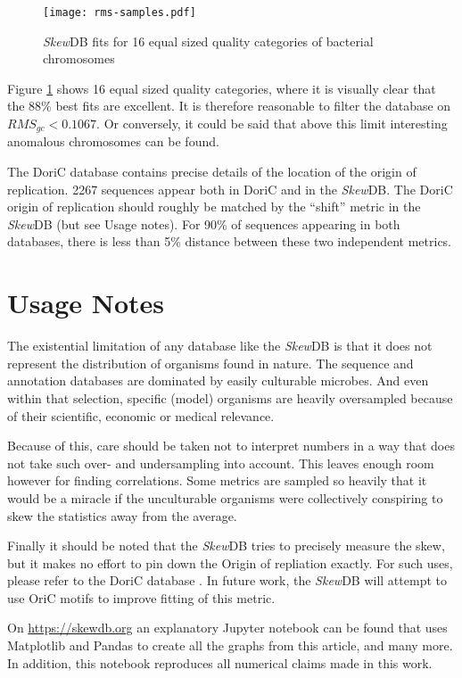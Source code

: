 \documentclass[fleqn,10pt]{wlscirep}
\begin{document}
\begin{figure}[tbhp]
\centering
\texttt{[image: rms-samples.pdf]}
\caption{\emph{Skew}DB fits for 16 equal sized quality categories of bacterial chromosomes}
\label{fig:rms-samples}
\end{figure}


Figure \ref{fig:rms-samples} shows 16 equal sized quality categories, where it is visually clear that the 88\% best fits are excellent. It is therefore reasonable to filter the database on $RMS_{gc}<0.1067$. Or conversely, it could be said that above this limit interesting anomalous chromosomes can be found. 

The DoriC database \cite{luo_doric_2019} contains precise details of the location of the origin of replication. 2267 sequences appear both in DoriC and in the \emph{Skew}DB. The DoriC origin of replication should roughly be matched by the ``shift'' metric in the \emph{Skew}DB (but see Usage notes). For 90\% of sequences appearing in both databases, there is less than 5\% distance between these two independent metrics.

\section*{Usage Notes}
The existential limitation of any database like the \emph{Skew}DB is that it does not represent the distribution of organisms found in nature. The sequence and annotation databases are dominated by easily culturable microbes. And even within that selection, specific (model) organisms are heavily oversampled because of their scientific, economic or medical relevance.

Because of this, care should be taken not to interpret numbers in a way that does not take such over- and undersampling into account. This leaves enough room however for finding correlations. Some metrics are sampled so heavily that it would be a miracle if the unculturable organisms were collectively conspiring to skew the statistics away from the average.

Finally it should be noted that the \emph{Skew}DB tries to precisely measure the skew, but it makes no effort to pin down the Origin of repliation exactly. For such uses, please refer to the DoriC database \cite{luo_doric_2019}. In future work, the \emph{Skew}DB will attempt to use OriC motifs to improve fitting of this metric.

On \url{https://skewdb.org} an explanatory Jupyter \cite{Kluyver:2016aa} notebook can be found that uses Matplotlib \cite{Hunter:2007} and Pandas \cite{jeff_reback_2021_5203279} to create all the graphs from this article, and many more. In addition, this notebook reproduces all numerical claims made in this work. 
\end{document}

